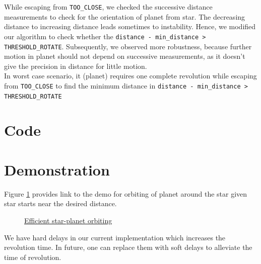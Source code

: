 \documentclass{report}[12pt]
\begin{document}
While escaping from \texttt{TOO\_CLOSE}, we checked the successive distance measurements to check for the orientation of planet from star. The decreasing distance to increasing distance leads sometimes to instability. Hence, we modified our algorithm to check whether the \texttt{distance - min\_distance > THRESHOLD\_ROTATE}. Subsequently, we observed more robustness, because further motion in planet should not depend on successive measurements, as it doesn't give the precision in distance for little motion.\\

In worst case scenario, it (planet) requires one complete revolution while escaping from \texttt{TOO\_CLOSE} to find the minimum distance in \texttt{distance - min\_distance > THRESHOLD\_ROTATE}
\section{Code}




\section{Demonstration}
Figure \ref{fig:efficient_star_planet_orbiting} provides link to the demo for orbiting of planet around the star given star starts near the desired distance.
\begin{figure}[H]
	\centering
	\caption{\href{https://youtu.be/LRgOzhAJI1k}{Efficient star-planet orbiting}}
	\label{fig:efficient_star_planet_orbiting}
\end{figure}
We have hard delays in our current implementation which increases the revolution time. In future, one can replace them with soft delays to alleviate the time of revolution.
\end{document}
